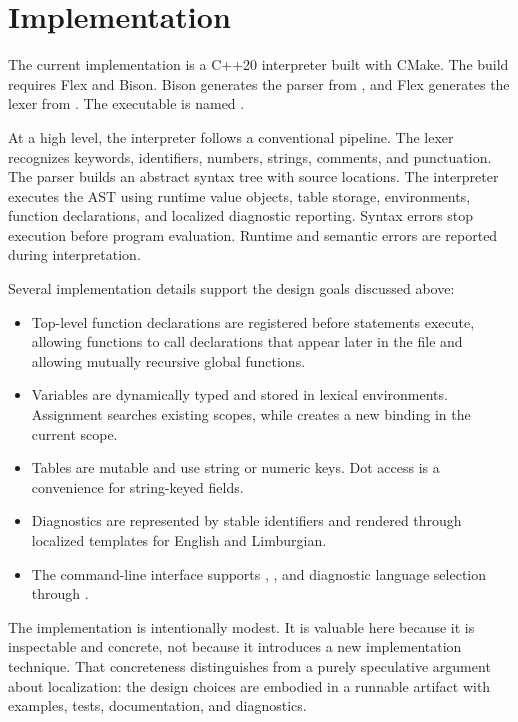 \section{Implementation}

The current implementation is a C++20 interpreter built with CMake. The build
requires Flex and Bison. Bison generates the parser from
, and Flex generates the lexer from
. The executable is named .

At a high level, the interpreter follows a conventional pipeline. The lexer
recognizes keywords, identifiers, numbers, strings, comments, and punctuation.
The parser builds an abstract syntax tree with source locations. The
interpreter executes the AST using runtime value objects, table storage,
environments, function declarations, and localized diagnostic reporting.
Syntax errors stop execution before program evaluation. Runtime and semantic
errors are reported during interpretation.

Several implementation details support the design goals discussed above:

\begin{itemize}
  \item Top-level function declarations are registered before statements
        execute, allowing functions to call declarations that appear later in
        the file and allowing mutually recursive global functions.
  \item Variables are dynamically typed and stored in lexical environments.
        Assignment searches existing scopes, while  creates a new
        binding in the current scope.
  \item Tables are mutable and use string or numeric keys. Dot access is a
        convenience for string-keyed fields.
  \item Diagnostics are represented by stable identifiers and rendered through
        localized templates for English and Limburgian.
  \item The command-line interface supports , ,
        and diagnostic language selection through .
\end{itemize}

The implementation is intentionally modest. It is valuable here because it is
inspectable and concrete, not because it introduces a new implementation
technique. That concreteness distinguishes \plat{} from a purely speculative
argument about localization: the design choices are embodied in a runnable
artifact with examples, tests, documentation, and diagnostics.

